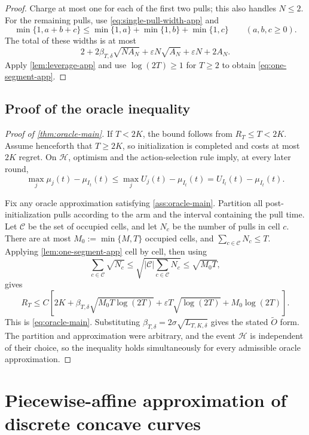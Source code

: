 \documentclass[11pt]{article}
\theoremstyle{remark}
\begin{document}
\begin{proof}
Charge at most one for each of the first two pulls; this also handles
$N\le2$. For the remaining pulls, use \eqref{eq:single-pull-width-app} and
\[
\min\{1,a+b+c\}
\le\min\{1,a\}+\min\{1,b\}+\min\{1,c\}
\qquad(a,b,c\ge0).
\]
The total of these widths is at most
\[
2+2\beta_{T,\delta}\sqrt{NA_N}
+\varepsilon N\sqrt{A_N}
+\varepsilon N+2A_N.
\]
Apply \cref{lem:leverage-app} and use $\log(2T)\ge1$ for $T\ge2$ to obtain
\eqref{eq:one-segment-app}.
\end{proof}

\subsection{Proof of the oracle inequality}

\begin{proof}[Proof of \cref{thm:oracle-main}]
If $T<2K$, the bound follows from $R_T\le T<2K$. Assume henceforth that
$T\ge2K$, so initialization is completed and costs at most $2K$ regret. On
$\mathcal H$, optimism and the action-selection rule imply, at every later
round,
\begin{equation}\label{eq:ucb-regret-app}
\max_j\mu_j(t)-\mu_{I_t}(t)
\le\max_jU_j(t)-\mu_{I_t}(t)
=U_{I_t}(t)-\mu_{I_t}(t).
\end{equation}

Fix any oracle approximation satisfying \cref{ass:oracle-main}. Partition all
post-initialization pulls according to the arm and the interval containing
the pull time. Let $\mathcal C$ be the set of occupied cells, and let $N_c$
be the number of pulls in cell $c$. There are at most
$M_0:=\min\{M,T\}$ occupied cells, and $\sum_{c\in\mathcal C}N_c\le T$.
Applying \cref{lem:one-segment-app} cell by cell, then using
\[
\sum_{c\in\mathcal C}\sqrt{N_c}
\le\sqrt{|\mathcal C|\sum_{c\in\mathcal C}N_c}
\le\sqrt{M_0T},
\]
gives
\[
R_T\le C\left[
2K+\beta_{T,\delta}\sqrt{M_0T\log(2T)}
+\varepsilon T\sqrt{\log(2T)}
+M_0\log(2T)
\right].
\]
This is \eqref{eq:oracle-main}. Substituting
$\beta_{T,\delta}=2\sigma\sqrt{L_{T,K,\delta}}$ gives the stated
$\widetilde O$ form. The partition and approximation were arbitrary, and
the event $\mathcal H$ is independent of their choice, so the inequality
holds simultaneously for every admissible oracle approximation.
\end{proof}

\section{Piecewise-affine approximation of discrete concave curves}
\label{app:approx}
\end{document}

